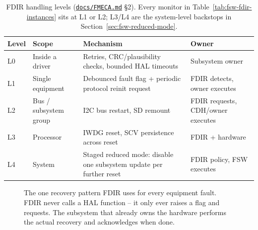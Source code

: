 \begin{table}[H]
\centering
\begin{tabular}{p{0.9cm}p{3.0cm}p{6.4cm}p{2.8cm}}
\toprule
\textbf{Level} & \textbf{Scope} & \textbf{Mechanism} & \textbf{Owner} \\
\midrule
L0 & Inside a driver & Retries, CRC/plausibility checks, bounded HAL timeouts & Subsystem owner \\
L1 & Single equipment & Debounced fault flag + periodic protocol reinit request & FDIR detects, owner executes \\
L2 & Bus / subsystem group & I2C bus restart, SD remount & FDIR requests, CDH/owner executes \\
L3 & Processor & IWDG reset, SCV persistence across reset & FDIR + hardware \\
L4 & System & Staged reduced mode: disable one subsystem update per further reset & FDIR policy, FSW executes \\
\bottomrule
\end{tabular}
\caption{FDIR handling levels (\href{\repourl/blob/main/firmware-stm32/docs/FMECA.md}{\texttt{docs/FMECA.md}} \S2). Every monitor in
Table~\ref{tab:fsw-fdir-instances} sits at L1 or L2; L3/L4 are the
system-level backstops in Section~\ref{sec:fsw-reduced-mode}.}
\label{tab:fsw-fdir-levels}
\end{table}

\begin{figure}[H]
\centering
{}
\caption{The one recovery pattern FDIR uses for every equipment fault.
FDIR never calls a HAL function -- it only ever raises a flag and
requests. The subsystem that already owns the hardware performs the
actual recovery and acknowledges when done.}
\label{fig:fsw-fdir-loop}
\end{figure}

